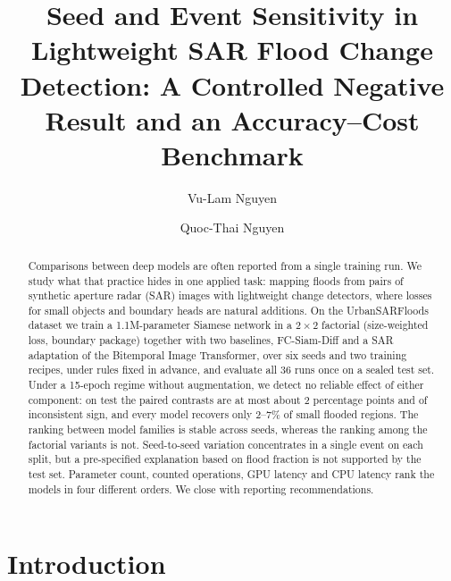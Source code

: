 \documentclass[runningheads]{llncs}
\begin{document}
\title{Seed and Event Sensitivity in Lightweight SAR Flood Change Detection: A Controlled Negative Result and an Accuracy--Cost Benchmark}

\author{Vu-Lam Nguyen \and Quoc-Thai Nguyen}

\maketitle

\begin{abstract}
Comparisons between deep models are often reported from a single training run. We study what
that practice hides in one applied task: mapping floods from pairs of synthetic aperture
radar (SAR) images with lightweight change detectors, where losses for small objects and
boundary heads are natural additions. On the UrbanSARFloods dataset we train a
1.1M-parameter Siamese network in a $2\times 2$ factorial (size-weighted loss, boundary
package) together with two baselines, FC-Siam-Diff and a SAR adaptation of the Bitemporal
Image Transformer, over six seeds and two training recipes, under rules fixed in advance, and
evaluate all 36 runs once on a sealed test set. Under a 15-epoch regime without augmentation,
we detect no reliable effect of either component: on test the paired contrasts are at most
about 2 percentage points and of inconsistent sign, and every model recovers only 2--7\% of
small flooded regions. The ranking between model families is stable across seeds, whereas
the ranking among the factorial variants is not. Seed-to-seed variation concentrates in a
single event on each split, but a pre-specified explanation based on flood fraction is not
supported by the test set. Parameter count, counted operations, GPU latency and CPU latency
rank the models in four different orders. We close with reporting recommendations.

\end{abstract}

\section{Introduction}
\end{document}
